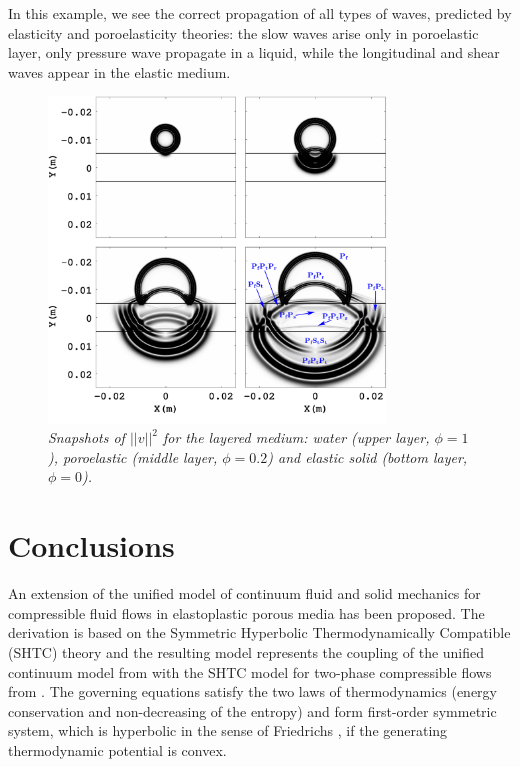\documentclass[3p,times,table]{article}
\begin{document}
In this example, we see the correct propagation of all types of waves, 
predicted by elasticity and poroelasticity theories: the slow waves arise only 
in poroelastic layer, only pressure wave propagate in a liquid, while the  
longitudinal and shear waves appear in the elastic medium.
\begin{figure}[!htbp]
	\begin{center}
	\includegraphics[draft=false,width=0.8\textwidth]{Figures/Layered_media_u1_u2_v4}
	\end{center}
	\caption{{\footnotesize \it  Snapshots of $ ||v||^2 $ for the layered medium: water (upper 
	layer, $ \phi=1 $), poroelastic (middle layer,  $ \phi=0.2 $) and elastic 
	solid  (bottom layer, $ \phi=0 $).}}
	\label{fig: layered_snap}
\end{figure}


\section{Conclusions}

An extension of the unified model of continuum fluid and solid mechanics 
\cite{DPRZ2016} for compressible fluid flows in elastoplastic porous media has 
been proposed.
The derivation  is based on the Symmetric Hyperbolic 
Thermodynamically Compatible (SHTC) theory \cite{SHTC-GENERIC-CMAT} and the 
resulting model represents the coupling of the unified continuum model from 
\cite{DPRZ2016} with the SHTC model for two-phase compressible flows from 
\cite{RomDrikToro2010}.
The governing equations satisfy the two laws of thermodynamics (energy 
conservation and non-decreasing of the entropy) and form first-order symmetric  
system, 
which 
is hyperbolic in the sense of Friedrichs \cite{Friedrichs1958}, if the 
generating thermodynamic potential is convex.
\end{document}
